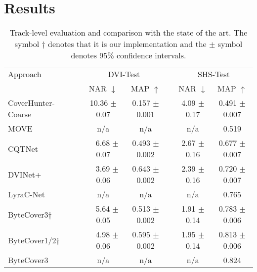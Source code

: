 
\section{Results}
\label{sec:results}

\begin{table*}[t]
\caption{Track-level evaluation and comparison with the state of the art. The symbol $\dag$ denotes that it is our implementation and the $\pm$ symbol denotes 95\% confidence intervals. %
}
\label{tab:sota}
\tablecaptionspace
\begin{center}
\begin{small}
\begin{sc}
\begin{tabular}{llccccc}
\toprule
Approach & & \multicolumn{2}{c}{DVI-Test}      & & \multicolumn{2}{c}{SHS-Test} \\
        \cline{3-4} \cline{6-7}
         & & NAR $\downarrow$ & MAP $\uparrow$ & & NAR $\downarrow$ & MAP $\uparrow$ \\
\midrule
CoverHunter-Coarse~\cite{liu_coverhunter_2023} & & 10.36 $\pm$ 0.07 & 0.157 $\pm$ 0.001 & & 4.09 $\pm$ 0.17 & 0.491 $\pm$ 0.007 \\
MOVE~\cite{yesiler_accurate_2020} & & n/a             & n/a             & & n/a           & 0.519\hspace{1.2cm} \\
CQTNet~\cite{yu_learning_2020}                 & & ~~6.68 $\pm$ 0.07 & 0.493 $\pm$ 0.002 & & 2.67 $\pm$ 0.16 & 0.677 $\pm$ 0.007 \\
DVINet+~\cite{araz_discogs-vinet-mirex_2024}   & & ~~3.69 $\pm$ 0.06 & 0.643 $\pm$ 0.002 & & 2.39 $\pm$ 0.16 & 0.720 $\pm$ 0.007 \\
LyraC-Net~\cite{hu_wideresnet_2022}            & & n/a             & n/a             & & n/a           & 0.765\hspace{1.2cm} \\
ByteCover3$\dag$~\citep[based on][]{du_bytecover3_2023} & & ~~5.64 $\pm$ 0.05 & 0.513 $\pm$ 0.002 & & 1.91 $\pm$ 0.14 & 0.783 $\pm$ 0.006 \\
ByteCover1/2$\dag$~\citep[based on][]{du_bytecover2_2022} & & ~~4.98 $\pm$ 0.06 & 0.595 $\pm$ 0.002 & & 1.95 $\pm$ 0.14 & 0.813 $\pm$ 0.006 \\
ByteCover3~\cite{du_bytecover3_2023}           & & n/a             & n/a             & & n/a           & 0.824\hspace{1.2cm} \\

\end{tabular}
\end{sc}
\end{small}
\end{center}
\end{table*}
